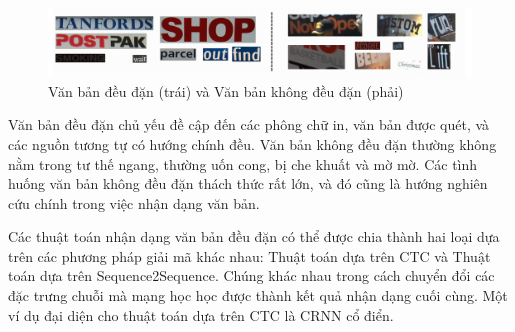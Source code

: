 \begin{figure}[h]
    \includegraphics[scale=0.4]{images/regular-irregular-text.png}
    \centering
    \caption{Văn bản đều đặn (trái) và Văn bản không đều đặn (phải)}
\end{figure}

Văn bản đều đặn chủ yếu đề cập đến các phông chữ in, văn bản được quét, và các nguồn tương tự có hướng chính đều. Văn bản không đều đặn thường không nằm trong tư thế ngang, thường uốn cong, bị che khuất và mờ mờ. Các tình huống văn bản không đều đặn thách thức rất lớn, và đó cũng là hướng nghiên cứu chính trong việc nhận dạng văn bản.

Các thuật toán nhận dạng văn bản đều đặn có thể được chia thành hai loại dựa trên các phương pháp giải mã khác nhau: Thuật toán dựa trên CTC và Thuật toán dựa trên Sequence2Sequence. Chúng khác nhau trong cách chuyển đổi các đặc trưng chuỗi mà mạng học học được thành kết quả nhận dạng cuối cùng. Một ví dụ đại diện cho thuật toán dựa trên CTC là CRNN cổ điển.

